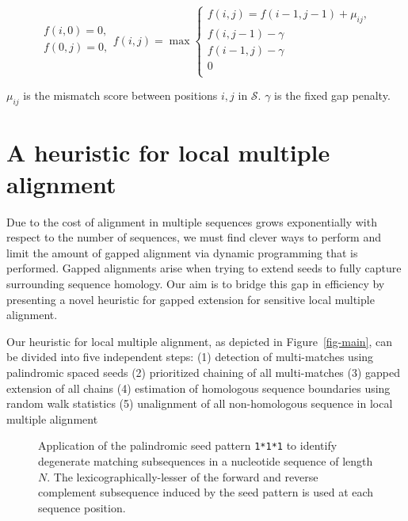 \documentclass[twoside,11pt]{article}
\begin{document}
$$
\begin{array}{l}
f(i,0) = 0,\\
f(0,j) = 0,\\
\end{array}
f(i,j)= \max\left\{\begin{array}{l}
f(i,j) = f(i-1,j-1)+\mu_{ij},\\
f(i,j-1) - \gamma\\
f(i-1,j)-\gamma\\
0 \\
\end{array}\right.
$$
\begin{center}
$\mu_{ij}$ is the mismatch score between positions $i,j$ in $\mathcal{S}$.  $\gamma$ is the fixed gap penalty.
\end{center}

\section{A heuristic for local multiple alignment}
Due to the cost of alignment in multiple sequences grows exponentially with respect to the number of sequences, we must find clever ways to perform and limit the amount of gapped alignment via dynamic programming that is performed. Gapped alignments arise when trying to extend seeds to fully capture surrounding sequence homology. Our aim is to bridge this gap in efficiency by presenting a novel heuristic for gapped extension for sensitive local multiple alignment.

Our heuristic for local multiple alignment, as depicted in Figure~\ref{fig-main},
can be divided into five independent steps:
(1) detection of multi-matches using palindromic spaced seeds
(2) prioritized chaining of all multi-matches
(3) gapped extension of all chains
(4) estimation of homologous sequence boundaries using random walk statistics
(5) unalignment of all non-homologous sequence in local multiple alignment

\begin{figure}[t]
\centering {}
\caption{Application of the palindromic seed pattern
\texttt{1*1*1} to identify degenerate matching subsequences in a
nucleotide sequence of length $N$. The lexicographically-lesser of
the forward and reverse complement subsequence induced by the seed
pattern is used at each sequence position.}

\label{fig-seeds}\vspace{-0.2cm}
\end{figure}
\end{document}
